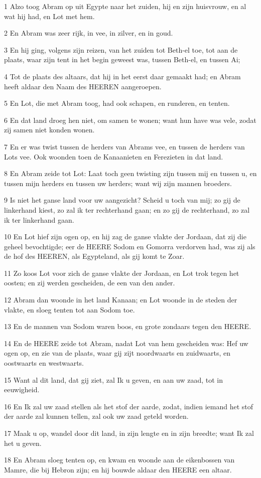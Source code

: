 \par 1 Alzo toog Abram op uit Egypte naar het zuiden, hij en zijn huisvrouw, en al wat hij had, en Lot met hem.
\par 2 En Abram was zeer rijk, in vee, in zilver, en in goud.
\par 3 En hij ging, volgens zijn reizen, van het zuiden tot Beth-el toe, tot aan de plaats, waar zijn tent in het begin geweest was, tussen Beth-el, en tussen Ai;
\par 4 Tot de plaats des altaars, dat hij in het eerst daar gemaakt had; en Abram heeft aldaar den Naam des HEEREN aangeroepen.
\par 5 En Lot, die met Abram toog, had ook schapen, en runderen, en tenten.
\par 6 En dat land droeg hen niet, om samen te wonen; want hun have was vele, zodat zij samen niet konden wonen.
\par 7 En er was twist tussen de herders van Abrams vee, en tussen de herders van Lots vee. Ook woonden toen de Kanaanieten en Ferezieten in dat land.
\par 8 En Abram zeide tot Lot: Laat toch geen twisting zijn tussen mij en tussen u, en tussen mijn herders en tussen uw herders; want wij zijn mannen broeders.
\par 9 Is niet het ganse land voor uw aangezicht? Scheid u toch van mij; zo gij de linkerhand kiest, zo zal ik ter rechterhand gaan; en zo gij de rechterhand, zo zal ik ter linkerhand gaan.
\par 10 En Lot hief zijn ogen op, en hij zag de ganse vlakte der Jordaan, dat zij die geheel bevochtigde; eer de HEERE Sodom en Gomorra verdorven had, was zij als de hof des HEEREN, als Egypteland, als gij komt te Zoar.
\par 11 Zo koos Lot voor zich de ganse vlakte der Jordaan, en Lot trok tegen het oosten; en zij werden gescheiden, de een van den ander.
\par 12 Abram dan woonde in het land Kanaan; en Lot woonde in de steden der vlakte, en sloeg tenten tot aan Sodom toe.
\par 13 En de mannen van Sodom waren boos, en grote zondaars tegen den HEERE.
\par 14 En de HEERE zeide tot Abram, nadat Lot van hem gescheiden was: Hef uw ogen op, en zie van de plaats, waar gij zijt noordwaarts en zuidwaarts, en oostwaarts en westwaarts.
\par 15 Want al dit land, dat gij ziet, zal Ik u geven, en aan uw zaad, tot in eeuwigheid.
\par 16 En Ik zal uw zaad stellen als het stof der aarde, zodat, indien iemand het stof der aarde zal kunnen tellen, zal ook uw zaad geteld worden.
\par 17 Maak u op, wandel door dit land, in zijn lengte en in zijn breedte; want Ik zal het u geven.
\par 18 En Abram sloeg tenten op, en kwam en woonde aan de eikenbossen van Mamre, die bij Hebron zijn; en hij bouwde aldaar den HEERE een altaar.

